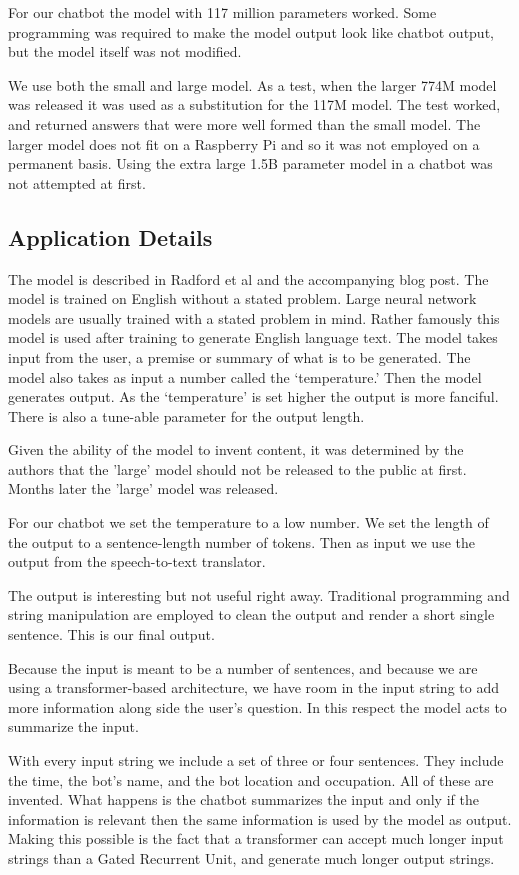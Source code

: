 For our chatbot the model with 117 million parameters worked. Some programming was required to make the model output look like chatbot output, but the model itself was not modified.

We use both the small and large model. As a test, when the larger 774M model was released it was used as a substitution for the 117M model. The test worked, and returned answers that were more well formed than the small model. The larger model does not fit on a Raspberry Pi and so it was not employed on a permanent basis. Using the extra large 1.5B parameter model in a chatbot was not attempted at first.

\subsection{Application Details}
The model is described in Radford et al \cite{radford2019language} and the accompanying blog post. The model is trained on English without a stated problem. Large neural network models are usually trained with a stated problem in mind. Rather famously this model is used after training to generate English language text. The model takes input from the user, a premise or summary of what is to be generated. The model also takes as input a number called the `temperature.' Then the model generates output. As the `temperature' is set higher the output is more fanciful. There is also a tune-able parameter for the output length. 

Given the ability of the model to invent content, it was determined by the authors that the 'large' model should not be released to the public at first. Months later the 'large' model was released. 

For our chatbot we set the temperature to a low number. We set the length of the output to a sentence-length number of tokens. Then as input we use the output from the speech-to-text translator.

The output is interesting but not useful right away. Traditional programming and string manipulation are employed to clean the output and render a short single sentence. This is our final output.

Because the input is meant to be a number of sentences, and because we are using a transformer-based architecture, we have room in the input string to add more information along side the user's question. In this respect the model acts to summarize the input. 

With every input string we include a set of three or four sentences. They include the time, the bot's name, and the bot location and occupation. All of these are invented. What happens is the chatbot summarizes the input and only if the information is relevant then the same information is used by the model as output. Making this possible is the fact that a transformer can accept much longer input strings than a Gated Recurrent Unit, and generate much longer output strings.

